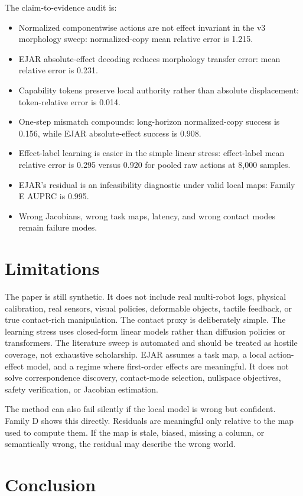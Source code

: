 \documentclass{article}
\begin{document}
The claim-to-evidence audit is:
\begin{itemize}
\item Normalized componentwise actions are not effect invariant in the v3 morphology sweep: normalized-copy mean relative error is 1.215.
\item EJAR absolute-effect decoding reduces morphology transfer error: mean relative error is 0.231.
\item Capability tokens preserve local authority rather than absolute displacement: token-relative error is 0.014.
\item One-step mismatch compounds: long-horizon normalized-copy success is 0.156, while EJAR absolute-effect success is 0.908.
\item Effect-label learning is easier in the simple linear stress: effect-label mean relative error is 0.295 versus 0.920 for pooled raw actions at 8,000 samples.
\item EJAR's residual is an infeasibility diagnostic under valid local maps: Family E AUPRC is 0.995.
\item Wrong Jacobians, wrong task maps, latency, and wrong contact modes remain failure modes.
\end{itemize}

\section{Limitations}

The paper is still synthetic. It does not include real multi-robot logs, physical calibration, real sensors, visual policies, deformable objects, tactile feedback, or true contact-rich manipulation. The contact proxy is deliberately simple. The learning stress uses closed-form linear models rather than diffusion policies or transformers. The literature sweep is automated and should be treated as hostile coverage, not exhaustive scholarship. EJAR assumes a task map, a local action-effect model, and a regime where first-order effects are meaningful. It does not solve correspondence discovery, contact-mode selection, nullspace objectives, safety verification, or Jacobian estimation.

The method can also fail silently if the local model is wrong but confident. Family D shows this directly. Residuals are meaningful only relative to the map used to compute them. If the map is stale, biased, missing a column, or semantically wrong, the residual may describe the wrong world.

\section{Conclusion}
\end{document}
